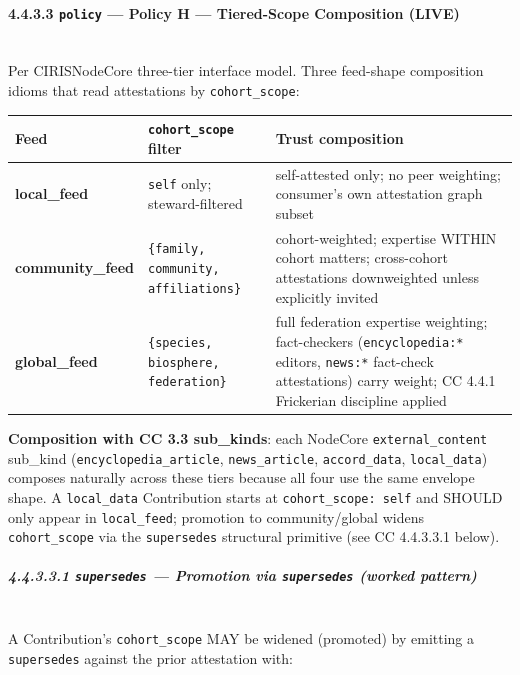 \documentclass[11pt]{article}
\begin{document}
\paragraph{4.4.3.3 \texttt{policy} — Policy H — Tiered-Scope Composition (LIVE)}\mbox{}\\


Per CIRISNodeCore three-tier interface model. Three feed-shape composition idioms that read attestations by \texttt{cohort\_scope}:


{\footnotesize
\begin{longtable}{|p{5.33cm}|p{5.33cm}|p{5.33cm}|}\hline
\textbf{Feed} & \textbf{\texttt{cohort\_scope} filter} & \textbf{Trust composition} \\ \hline\endhead
\textbf{local\_feed} & \texttt{self} only; steward-filtered & self-attested only; no peer weighting; consumer's own attestation graph subset \\ \hline
\textbf{community\_feed} & \texttt{\{family, community, affiliations\}} & cohort-weighted; expertise WITHIN cohort matters; cross-cohort attestations downweighted unless explicitly invited \\ \hline
\textbf{global\_feed} & \texttt{\{species, biosphere, federation\}} & full federation expertise weighting; fact-checkers (\texttt{encyclopedia:*} editors, \texttt{news:*} fact-check attestations) carry weight; CC 4.4.1 Frickerian discipline applied \\ \hline
\end{longtable}}


\textbf{Composition with CC 3.3 sub\_kinds}: each NodeCore \texttt{external\_content} sub\_kind (\texttt{encyclopedia\_article}, \texttt{news\_article}, \texttt{accord\_data}, \texttt{local\_data}) composes naturally across these tiers because all four use the same envelope shape. A \texttt{local\_data} Contribution starts at \texttt{cohort\_scope: self} and SHOULD only appear in \texttt{local\_feed}; promotion to community/global widens \texttt{cohort\_scope} via the \texttt{supersedes} structural primitive (see CC 4.4.3.3.1 below).


\subparagraph{4.4.3.3.1 \texttt{supersedes} — Promotion via \texttt{supersedes} (worked pattern)}\mbox{}\\


A Contribution's \texttt{cohort\_scope} MAY be widened (promoted) by emitting a \texttt{supersedes} against the prior attestation with:
\end{document}
